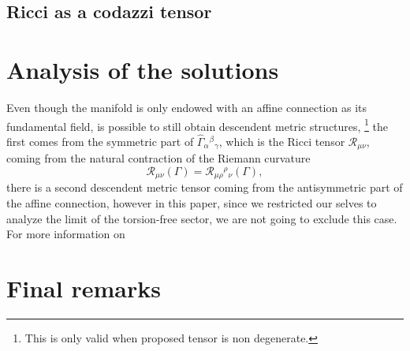 \documentclass{article}
\begin{document}
\subsection{Ricci as a codazzi tensor}

\section{Analysis of the solutions}

Even though the manifold is only endowed with an affine connection as its 
fundamental field, is possible to still obtain descendent metric structures,
\footnote{ This is only valid when proposed tensor is non degenerate.} 
the first comes from the symmetric part of $\hat{\Gamma}_{\alpha}{}^{\beta}{}_{\gamma}$, 
which is the Ricci tensor $\mathcal{R}_{\mu\nu}$, coming from the natural 
contraction of the Riemann curvature
\begin{equation}
    \label{ricci}
    \mathcal{R}_{\mu\nu}\left(\Gamma\right) = \mathcal{R}_{\mu\rho}{}^{\rho}{}_{\nu}\left(\Gamma\right),
\end{equation}
there is a second descendent metric tensor coming from the antisymmetric 
part of the affine connection, however in this paper, since we restricted
our selves to analyze the limit of the torsion-free sector, we are not
going to exclude this case. For more information on 


\section{Final remarks}
\label{sec:final_remarks}



\end{document}
